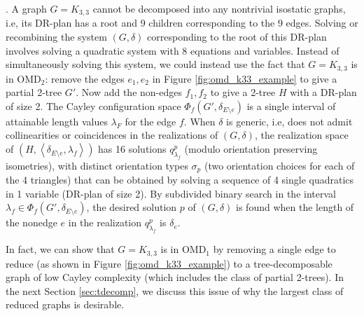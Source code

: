 
.
A graph $G=K_{3,3}$  cannot be decomposed into any nontrivial isostatic graphs, i.e, its DR-plan has a root and 9 children corresponding to the 9 edges. Solving or recombining the system $(G,\delta)$ corresponding to the root of this DR-plan involves solving a quadratic system with 8 equations and variables. Instead of simultaneously solving this system, we could instead use the fact that $G=K_{3,3}$ is in OMD$_2$: remove the edges $e_1,e_2$ in Figure \ref{fig:omd_k33_example} to give a partial 2-tree $G'$. Now add the non-edges $f_1,f_2$ to give a 2-tree $H$ with a DR-plan of size 2. The Cayley configuration space $\Phi_f(G', \delta_{E\setminus e})$ is a single interval of attainable length values $\lambda_F$ for the edge $f$. When $\delta$ is generic, i.e, does not admit collinearities or coincidences in the realizations of $(G,\delta)$, the realization space of $(H, \left<\delta_{E\setminus e}, \lambda_f\right>)$ has 16 solutions $q^p_{\lambda_f}$ (modulo orientation preserving isometries), with distinct orientation types $\sigma_p$ (two orientation choices for each of the 4 triangles) that can be obtained by solving a sequence of 4 single quadratics in 1 variable (DR-plan of size 2). By subdivided binary search in the interval $\lambda_f \in \Phi_f(G', \delta_{E\setminus e})$, the desired solution $p$  of $(G,\delta)$ is found when the length of the nonedge $e$ in  the realization $q^p_{\lambda_f}$ is $\delta_e$.

In fact, we can show that $G=K_{3,3}$ is in OMD$_1$ by removing a single edge to reduce (as shown in Figure \ref{fig:omd_k33_example}) to a tree-decomposable graph of low Cayley complexity (which includes the class of partial 2-trees). In the next Section \ref{sec:tdecomp}, we discuss this issue of why the largest class of reduced graphs is desirable.
%
